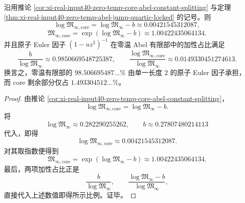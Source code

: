\begin{proposition}\label{prop:xi-real-input40-zero-temp-abel-atomic-share}
沿用推论 \ref{cor:xi-real-input40-zero-temp-core-abel-constant-splitting} 与定理
\ref{thm:xi-real-input40-zero-temp-abel-jump-quartic-locked} 的记号。则
\[
\boxed{\;
\log\mathfrak M_{\infty,\mathrm{core}}
=
\log\mathfrak M_\infty-b
\approx 0.00421545312087,\;}
\]
\[
\boxed{\;
\mathfrak M_{\infty,\mathrm{core}}
=
\exp(\log\mathfrak M_\infty-b)
\approx 1.00422435064134.\;}
\]
并且原子 Euler 因子 \((1-uz^2)^{-1}\) 在零温 Abel 有限部中的加性占比满足
\[
\boxed{\;
\frac{b}{\log\mathfrak M_\infty}
\approx 0.9850669548725387,\qquad
\frac{\log\mathfrak M_{\infty,\mathrm{core}}}{\log\mathfrak M_\infty}
\approx 0.0149330451274613.\;}
\]
换言之，零温有限部的 \(98.506695487\ldots\%\) 由单一长度 \(2\) 的原子 Euler 因子承担，而 core 剩余部分仅占 \(1.493304512\ldots\%\)。
\end{proposition}
\begin{proof}
由推论 \ref{cor:xi-real-input40-zero-temp-core-abel-constant-splitting}，
\[
\log\mathfrak M_{\infty,\mathrm{core}}=\log\mathfrak M_\infty-b.
\]
将
\[
\log\mathfrak M_\infty\approx 0.282290255262,
\qquad
b\approx 0.27807480214113
\]
代入，即得
\[
\log\mathfrak M_{\infty,\mathrm{core}}\approx 0.00421545312087.
\]
对其取指数便得到
\[
\mathfrak M_{\infty,\mathrm{core}}
=
\exp(\log\mathfrak M_\infty-b)
\approx 1.00422435064134.
\]
最后，两项加性占比正是
\[
\frac{b}{\log\mathfrak M_\infty},
\qquad
\frac{\log\mathfrak M_\infty-b}{\log\mathfrak M_\infty},
\]
直接代入上述数值即得所示比例。证毕。
\end{proof}
